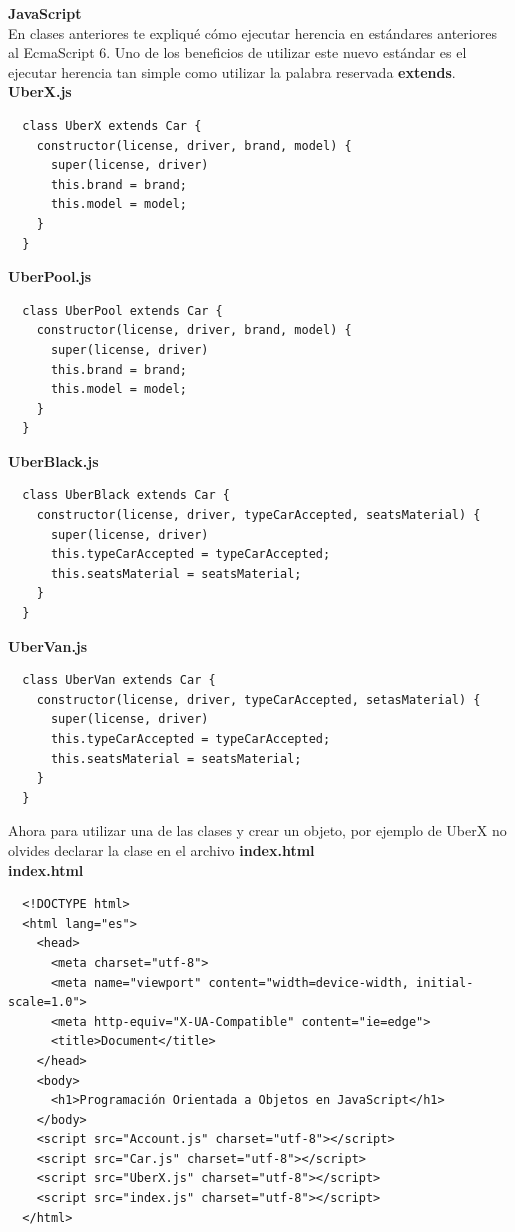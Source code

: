\documentclass{article}
\begin{document}
\textbf{JavaScript}\\
En clases anteriores te expliqué cómo ejecutar herencia en estándares
anteriores al EcmaScript 6. Uno de los beneficios de utilizar este nuevo
estándar es el ejecutar herencia tan simple como utilizar la palabra reservada
\textbf{extends}.\\

\textbf{UberX.js}
\begin{verbatim}
  class UberX extends Car {
    constructor(license, driver, brand, model) {
      super(license, driver)
      this.brand = brand;
      this.model = model;
    }
  }
\end{verbatim}

\textbf{UberPool.js}
\begin{verbatim}
  class UberPool extends Car {
    constructor(license, driver, brand, model) {
      super(license, driver)
      this.brand = brand;
      this.model = model;
    }
  }
\end{verbatim}

\textbf{UberBlack.js}
\begin{verbatim}
  class UberBlack extends Car {
    constructor(license, driver, typeCarAccepted, seatsMaterial) {
      super(license, driver)
      this.typeCarAccepted = typeCarAccepted;
      this.seatsMaterial = seatsMaterial;
    }
  }
\end{verbatim}

\textbf{UberVan.js}
\begin{verbatim}
  class UberVan extends Car {
    constructor(license, driver, typeCarAccepted, setasMaterial) {
      super(license, driver)
      this.typeCarAccepted = typeCarAccepted;
      this.seatsMaterial = seatsMaterial;
    }
  }
\end{verbatim}

Ahora para utilizar una de las clases y crear un objeto, por ejemplo de UberX
no olvides declarar la clase en el archivo \textbf{index.html}\\

\textbf{index.html}
\begin{verbatim}
  <!DOCTYPE html>
  <html lang="es">
    <head>
      <meta charset="utf-8">
      <meta name="viewport" content="width=device-width, initial-scale=1.0">
      <meta http-equiv="X-UA-Compatible" content="ie=edge">
      <title>Document</title>
    </head>
    <body>
      <h1>Programación Orientada a Objetos en JavaScript</h1>
    </body>
    <script src="Account.js" charset="utf-8"></script>
    <script src="Car.js" charset="utf-8"></script>
    <script src="UberX.js" charset="utf-8"></script>
    <script src="index.js" charset="utf-8"></script>
  </html>
\end{verbatim}
\end{document}
